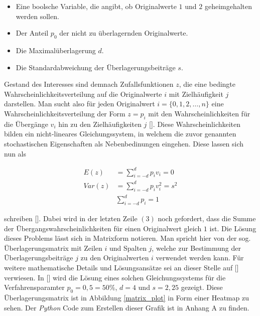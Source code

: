 \begin{itemize}
    \item Eine boolsche Variable, die angibt, ob Originalwerte $1$ und $2$ geheimgehalten werden sollen.
    \item Der Anteil $p_0$ der nicht zu überlagernden Originalwerte.
    \item Die Maximalüberlagerung $d$.
    \item Die Standardabweichung der Überlagerungsbeiträge $s$.
\end{itemize}

Gestand des Interesses sind demnach Zufallsfunktionen $z$, die eine bedingte Wahrscheinlichkeitsverteilung auf die Originalwerte $i$ mit Zielhäufigkeit $j$ darstellen. Man sucht also für jeden Originalwert $i = \{0, 1, 2, \dots, n \}$ eine Wahrscheinlichkeitsverteilung der Form $z = p_i$ mit den Wahrscheinlichkeiten für die Übergänge $v_i$ hin zu den Zielhäufigkeiten $j$ [\cite{Enderle}]. Diese Wahrscheinlichkeiten bilden ein nicht-lineares Gleichungssystem, in welchem die zuvor genannten stochastischen Eigenschaften als Nebenbedinungen eingehen. Diese lassen sich nun als 

\begin{align}
    E(z) & = \sum_{i = -d}^{d} p_i v_i = 0 \\
    Var(z) & = \sum_{i = -d}^{d} p_i v_{i}^{2} = s^2 \\
    & \sum_{i = -d}^{d} p_i = 1
\end{align}

schreiben [\cite{Höhne}]. Dabei wird in der letzten Zeile $(3)$ noch gefordert, dass die Summe der Übergangswahrscheinlichkeiten für einen Originalwert gleich $1$ ist. Die Lösung dieses Problems lässt sich in Matrixform notieren. Man spricht hier von der sog. Überlagerungsmatrix mit Zeilen $i$ und Spalten $j$, welche zur Bestimmung der Überlagerungsbeiträge $j$ zu den Originalwerten $i$ verwendet werden kann. Für weitere mathematische Details und Lösungsansätze sei an dieser Stelle auf [\cite{Giessing}] verwiesen. In [\cite{Höhne}] wird die Lösung eines solchen Gleichungssystems für die Verfahrensparamter $p_0 = 0,5 = 50\%$, $d = 4$ und $s = 2,25$ gezeigt. Diese Überlagerungsmatrix ist in Abbildung \ref{matrix_plot} in Form einer Heatmap zu sehen. Der \textit{Python} Code zum Erstellen dieser Grafik ist in Anhang A zu finden.

